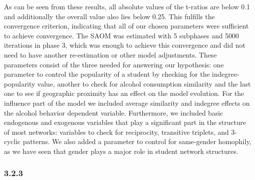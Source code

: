 \documentclass[
]{article}
\begin{document}
As can be seen from these results, all absolute values of the t-ratios
are below 0.1 and additionally the overall value also lies below 0.25.
This fulfills the convergence criterion, indicating that all of our
chosen parameters were sufficient to achieve convergence. The SAOM was
estimated with 5 subphases and 5000 iterations in phase 3, which was
enough to achieve this convergence and did not need to have another
re-estimation or other model adjustments. These parameters consist of
the three needed for answering our hypothesis: one parameter to control
the popularity of a student by checking for the indegree-popularity
value, another to check for alcohol consumption similarity and the last
one to see if geographic proximity has an effect on the model evolution.
For the influence part of the model we included average similarity and
indegree effects on the alcohol behavior dependent variable.
Furthermore, we included basic endogenous and exogenous variables that
play a significant part in the structure of most networks: variables to
check for reciprocity, transitive triplets, and 3-cyclic patterns. We
also added a parameter to control for same-gender homophily, as we have
seen that gender plays a major role in student network structures.

\subsubsection{3.2.3}\label{section-18}
\end{document}

